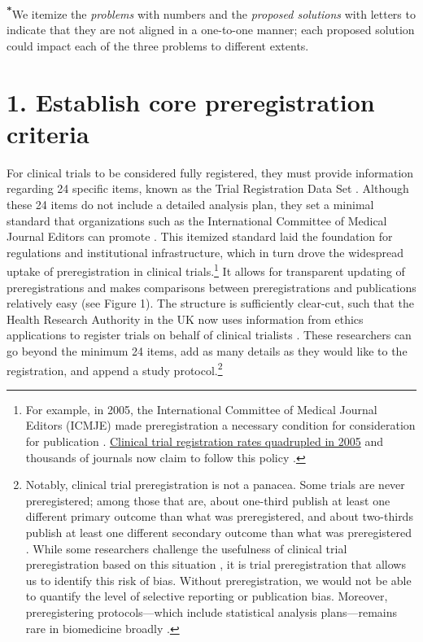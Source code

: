 \documentclass[authordate, meta, issue]{jote-new-article}
\begin{document}
\begin{table}
\begin{fullwidth}
{    \textsuperscript{\textbf{*}}We itemize the \emph{problems} with numbers and the \emph{proposed solutions} with letters to indicate that they are not aligned in a one-to-one manner; each proposed solution could impact each of the three problems to different extents.}

    \label{tab:table1}
  \end{fullwidth}
\end{table}


\section{1. Establish core preregistration criteria}


For clinical trials to be considered fully registered, they must provide information regarding 24 specific items, known as the Trial Registration Data Set \parencites{Organization2017}. Although these 24 items do not include a detailed analysis plan, they set a minimal standard that organizations such as the International Committee of Medical Journal Editors can promote \parencites{ICMJE2022}{ICMJE2023}. This itemized standard laid the foundation for regulations and institutional infrastructure, which in turn drove the widespread uptake of preregistration in clinical trials.\footnote{ For example, in 2005, the International Committee of Medical Journal Editors (ICMJE) made preregistration a necessary condition for consideration for publication \parencites{DeAngelis2004}. \href{http://web.archive.org/save/https://clinicaltrials.gov/ct2/resources/trends}{Clinical trial registration rates quadrupled in 2005} and thousands of journals now claim to follow this policy \parencites{ICMJE2023}.} It allows for transparent updating of preregistrations and makes comparisons between preregistrations and publications relatively easy (see Figure 1). The structure is sufficiently clear-cut, such that the Health Research Authority in the UK now uses information from ethics applications to register trials on behalf of clinical trialists \parencites{Authority2021}. These researchers can go beyond the minimum 24 items, add as many details as they would like to the registration, and append a study protocol.\footnote{ Notably, clinical trial preregistration is not a panacea. Some trials are never preregistered; among those that are, about one-third publish at least one different primary outcome than what was preregistered, and about two-thirds publish at least one different secondary outcome than what was preregistered \parencites{TARG2021}. While some researchers challenge the usefulness of clinical trial preregistration based on this situation \parencites[e.g.,][]{Lash2022}{Abrams2020}, it is trial preregistration that allows us to identify this risk of bias. Without preregistration, we would not be able to quantify the level of selective reporting or publication bias. Moreover, preregistering protocols—which include statistical analysis plans—remains rare in biomedicine broadly \parencites{Serghiou2021}.}
\end{document}

